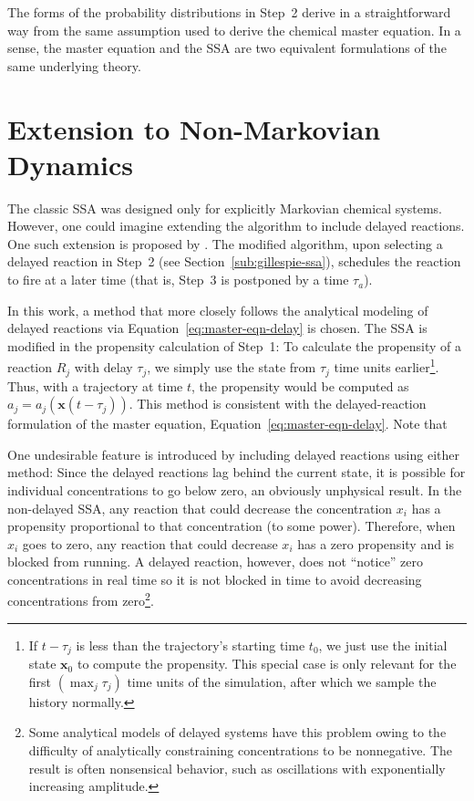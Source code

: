 \documentclass[english,letterpaper,12pt]{report}
\renewcommand{\vec}[1]{\ensuremath{\mathbf{#1}}}
\newcommand{\delaytime}{\ensuremath{\tau}}
\begin{document}
\begin{doublespacing}
The forms of the probability distributions in Step~2 derive in a straightforward way from the same assumption used to derive the chemical master equation. In a sense, the master equation and the SSA are two equivalent formulations of the same underlying theory.


\section{Extension to Non-Markovian Dynamics} %
\label{sub:non-markovian}

The classic SSA was designed only for explicitly Markovian chemical systems. However, one could imagine extending the algorithm to include delayed reactions. One such extension is proposed by \cite{delay-oscillations}. The modified algorithm, upon selecting a delayed reaction in Step~2 (see Section~\ref{sub:gillespie-ssa}), schedules the reaction to fire at a later time (that is, Step~3 is postponed by a time $\tau_a$).

In this work, a method that more closely follows the analytical modeling of delayed reactions via Equation~\eqref{eq:master-eqn-delay} is chosen. The SSA is modified in the propensity calculation of Step~1: To calculate the propensity of a reaction $R_j$ with delay $\delaytime_j$, we simply use the state from $\delaytime_j$ time units earlier\footnote{If $t - \tau_j$ is less than the trajectory's starting time $t_0$, we just use the initial state $\vec{x}_0$ to compute the propensity. This special case is only relevant for the first $(\max_j \tau_j)$ time units of the simulation, after which we sample the history normally.}. Thus, with a trajectory at time $t$, the propensity would be computed as $a_j = a_j\left(\vec{x}(t - \delaytime_j)\right)$. This method is consistent with the delayed-reaction formulation of the master equation, Equation~\eqref{eq:master-eqn-delay}. Note that 

One undesirable feature is introduced by including delayed reactions using either method: Since the delayed reactions lag behind the current state, it is possible for individual concentrations to go below zero, an obviously unphysical result. In the non-delayed SSA, any reaction that could decrease the concentration $x_i$ has a propensity proportional to that concentration (to some power). Therefore, when $x_i$ goes to zero, any reaction that could decrease $x_i$ has a zero propensity and is blocked from running. A delayed reaction, however, does not ``notice'' zero concentrations in real time so it is not blocked in time to avoid decreasing concentrations from zero\footnote{Some analytical models of delayed systems have this problem owing to the difficulty of analytically constraining concentrations to be nonnegative. The result is often nonsensical behavior, such as oscillations with exponentially increasing amplitude.}.


\end{doublespacing}
\end{document}
